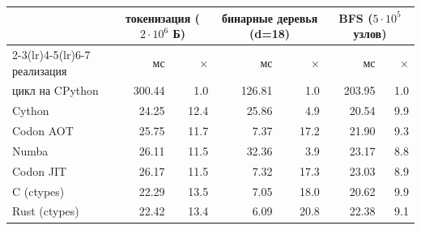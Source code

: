 \begin{tabular}{lrrrrrr}
\toprule
& \multicolumn{2}{c}{токенизация ($2{\cdot}10^6$ Б)} & \multicolumn{2}{c}{бинарные деревья (d{=}18)} & \multicolumn{2}{c}{BFS ($5{\cdot}10^5$ узлов)} \\
\cmidrule(lr){2-3}\cmidrule(lr){4-5}\cmidrule(lr){6-7}
реализация & мс & $\times$ & мс & $\times$ & мс & $\times$ \\
\midrule
цикл на CPython & 300.44 & 1.0 & 126.81 & 1.0 & 203.95 & 1.0 \\
Cython & 24.25 & 12.4 & 25.86 & 4.9 & 20.54 & 9.9 \\
Codon AOT & 25.75 & 11.7 & 7.37 & 17.2 & 21.90 & 9.3 \\
Numba & 26.11 & 11.5 & 32.36 & 3.9 & 23.17 & 8.8 \\
Codon JIT & 26.17 & 11.5 & 7.32 & 17.3 & 23.03 & 8.9 \\
C (ctypes) & 22.29 & 13.5 & 7.05 & 18.0 & 20.62 & 9.9 \\
Rust (ctypes) & 22.42 & 13.4 & 6.09 & 20.8 & 22.38 & 9.1 \\
\bottomrule
\end{tabular}
